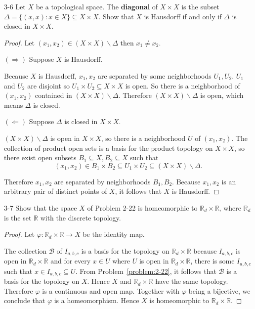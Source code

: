 \begin{problem}{3-6}
Let $X$ be a topological space. The \textbf{diagonal} of $X\times X$ is the subset $\Delta = \{ (x, x): x\in X \}\subseteq X\times X$. Show that $X$ is Hausdorff if and only if $\Delta$ is closed in $X\times X$.
\end{problem}

\begin{proof}
	Let $(x_{1}, x_{2})\in (X\times X)\smallsetminus\Delta$ then $x_{1}\ne x_{2}$.

	$(\Longrightarrow)$ Suppose $X$ is Hausdorff.

	Because $X$ is Hausdorff, $x_{1}, x_{2}$ are separated by some neighborhoods $U_{1}, U_{2}$. $U_{1}$ and $U_{2}$ are disjoint so $U_{1}\times U_{2}\subseteq X\times X$ is open. So there is a neighborhood of $(x_{1}, x_{2})$ contained in $(X\times X)\smallsetminus\Delta$. Therefore $(X\times X)\smallsetminus\Delta$ is open, which means $\Delta$ is closed.

	$(\Longleftarrow)$ Suppose $\Delta$ is closed in $X\times X$.

	$(X\times X)\smallsetminus\Delta$ is open in $X\times X$, so there is a neighborhood $U$ of $(x_{1}, x_{2})$. The collection of product open sets is a basis for the product topology on $X\times X$, so there exist open subsets $B_{1}\subseteq X, B_{2}\subseteq X$ such that
	\[
		(x_{1}, x_{2})\in B_{1}\times B_{2}\subseteq U_{1}\times U_{2}\subseteq (X\times X)\smallsetminus\Delta.
	\]

	Therefore $x_{1}, x_{2}$ are separated by neighborhoods $B_{1}, B_{2}$. Because $x_{1}, x_{2}$ is an arbitrary pair of distinct points of $X$, it follows that $X$ is Hausdorff.
\end{proof}

\begin{problem}{3-7}
Show that the space $X$ of Problem 2-22 is homeomorphic to $\mathbb{R}_{d}\times\mathbb{R}$, where $\mathbb{R}_{d}$ is the set $\mathbb{R}$ with the discrete topology.
\end{problem}

\begin{proof}
	Let $\varphi: \mathbb{R}_{d}\times\mathbb{R}\to X$ be the identity map.

	The collection $\mathscr{B}$ of $I_{a,b,c}$ is a basis for the topology on $\mathbb{R}_{d}\times\mathbb{R}$ because $I_{a,b,c}$ is open in $\mathbb{R}_{d}\times\mathbb{R}$ and for every $x\in U$ where $U$ is open in $\mathbb{R}_{d}\times\mathbb{R}$, there is some $I_{a,b,c}$ such that $x\in I_{a,b,c} \subseteq U$. From Problem~\ref{problem:2-22}, it follows that $\mathscr{B}$ is a basis for the topology on $X$. Hence $X$ and $\mathbb{R}_{d}\times\mathbb{R}$ have the same topology. Therefore $\varphi$ is a continuous and open map. Together with $\varphi$ being a bijective, we conclude that $\varphi$ is a homeomorphism. Hence $X$ is homeomorphic to $\mathbb{R}_{d}\times\mathbb{R}$.
\end{proof}

